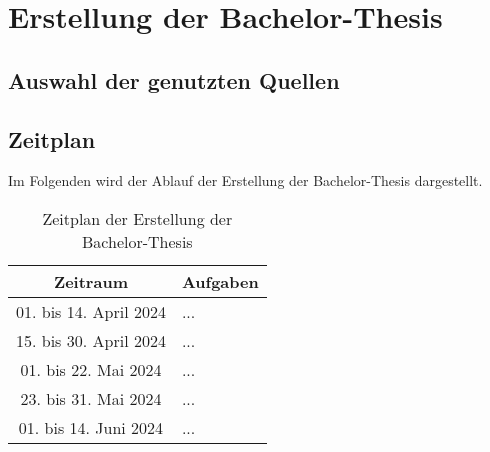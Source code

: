 \section{Erstellung der Bachelor-Thesis}


\subsection{Auswahl der genutzten Quellen}


\subsection{Zeitplan}

Im Folgenden wird der Ablauf der Erstellung der Bachelor-Thesis dargestellt.

\begin{center}
    \begin{table}[h]
    \centering
    \begin{tabular}{|c|p{6cm}|}
        \hline
        \textbf{Zeitraum} & \textbf{Aufgaben} \\
        \hline
        01. bis 14. April 2024 & ... \\
        \hline
        15. bis 30. April 2024 & ...\\
        \hline
        01. bis 22. Mai 2024 & ...\\
        \hline
        23. bis 31. Mai 2024 & ... \\
        \hline
        01. bis 14. Juni 2024 & ... \\
        \hline
    \end{tabular}
    \caption{Zeitplan der Erstellung der Bachelor-Thesis}
    \label{tab:timetable}
    \end{table}
\end{center}
